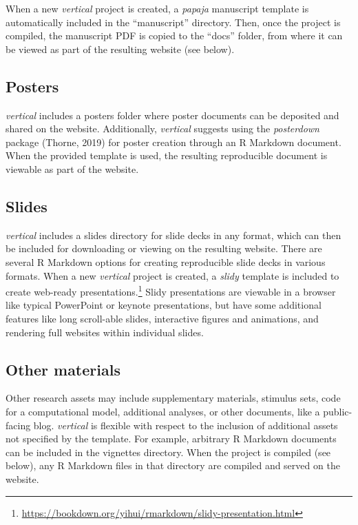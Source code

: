 \documentclass[
  english,
  jou,floatsintext]{apa6}
\begin{document}
When a new \emph{vertical} project is created, a \emph{papaja} manuscript template is automatically included in the ``manuscript'' directory. Then, once the project is compiled, the manuscript PDF is copied to the ``docs'' folder, from where it can be viewed as part of the resulting website (see below).

\hypertarget{posters}{%
\subsection{Posters}\label{posters}}

\emph{vertical} includes a posters folder where poster documents can be deposited and shared on the website. Additionally, \emph{vertical} suggests using the \emph{posterdown} package (Thorne, 2019) for poster creation through an R Markdown document. When the provided template is used, the resulting reproducible document is viewable as part of the website.

\hypertarget{slides}{%
\subsection{Slides}\label{slides}}

\emph{vertical} includes a slides directory for slide decks in any format, which can then be included for downloading or viewing on the resulting website. There are several R Markdown options for creating reproducible slide decks in various formats. When a new \emph{vertical} project is created, a \emph{slidy} template is included to create web-ready presentations.\footnote{\url{https://bookdown.org/yihui/rmarkdown/slidy-presentation.html}} Slidy presentations are viewable in a browser like typical PowerPoint or keynote presentations, but have some additional features like long scroll-able slides, interactive figures and animations, and rendering full websites within individual slides.

\hypertarget{other-materials}{%
\subsection{Other materials}\label{other-materials}}

Other research assets may include supplementary materials, stimulus sets, code for a computational model, additional analyses, or other documents, like a public-facing blog. \emph{vertical} is flexible with respect to the inclusion of additional assets not specified by the template. For example, arbitrary R Markdown documents can be included in the vignettes directory. When the project is compiled (see below), any R Markdown files in that directory are compiled and served on the website.
\end{document}
